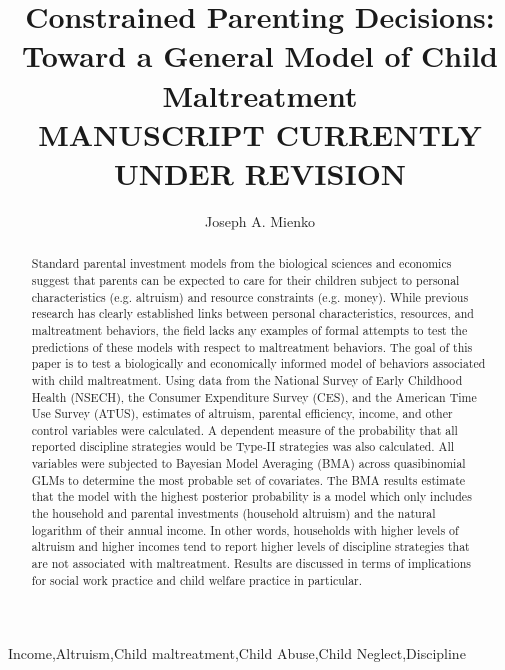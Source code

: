 \documentclass[review]{elsarticle}\usepackage[]{graphicx}\usepackage[]{color}
\begin{document}
\begin{frontmatter}

\title{Constrained Parenting Decisions: \\Toward a General Model of Child Maltreatment\\
MANUSCRIPT CURRENTLY UNDER REVISION}

\author{Joseph A. Mienko}
\address{University of Washington}


\begin{abstract}
Standard parental investment models from the biological sciences and economics suggest that parents can be expected to care for their children subject to personal characteristics (e.g. altruism) and resource constraints (e.g. money). While previous research has clearly established links between personal characteristics, resources, and maltreatment behaviors, the field lacks any examples of formal attempts to test the predictions of these models with respect to maltreatment behaviors. The goal of this paper is to test a biologically and economically informed model of behaviors associated with child maltreatment. Using data from the National Survey of Early Childhood Health (NSECH), the Consumer Expenditure Survey (CES), and the American Time Use Survey (ATUS), estimates of altruism, parental efficiency, income, and other control variables were calculated. A dependent measure of the probability that all reported discipline strategies would be Type-II strategies was also calculated. All variables were subjected to Bayesian Model Averaging (BMA) across quasibinomial GLMs to determine the most probable set of covariates. The BMA results estimate that the model with the highest posterior probability is a model which only includes the household and parental investments (household altruism) and the natural logarithm of their annual income. In other words, households with higher levels of altruism and higher incomes tend to report higher levels of discipline strategies that are not associated with maltreatment. Results are discussed in terms of implications for social work practice and child welfare practice in particular. 
\end{abstract}

\begin{keyword}
Income\sep Altruism\sep Child maltreatment\sep Child Abuse\sep Child Neglect\sep Discipline 
\end{keyword}

\end{frontmatter}
\end{document}
